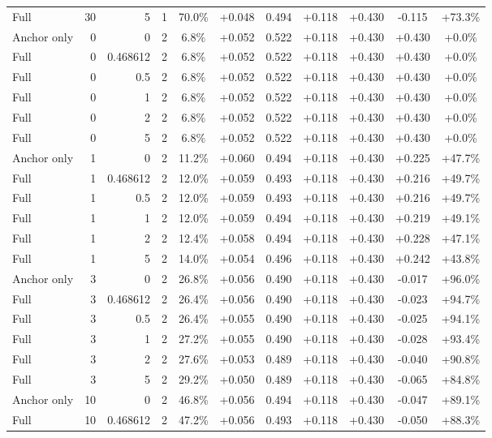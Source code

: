 \begin{table}[htbp]
\begin{tabular}{lrrrccccccc}
Full & 30 & 5 & 1 & 70.0\% & +0.048 & 0.494 & +0.118 & +0.430 & -0.115 & +73.3\% \\
Anchor only & 0 & 0 & 2 & 6.8\% & +0.052 & 0.522 & +0.118 & +0.430 & +0.430 & +0.0\% \\
Full & 0 & 0.468612 & 2 & 6.8\% & +0.052 & 0.522 & +0.118 & +0.430 & +0.430 & +0.0\% \\
Full & 0 & 0.5 & 2 & 6.8\% & +0.052 & 0.522 & +0.118 & +0.430 & +0.430 & +0.0\% \\
Full & 0 & 1 & 2 & 6.8\% & +0.052 & 0.522 & +0.118 & +0.430 & +0.430 & +0.0\% \\
Full & 0 & 2 & 2 & 6.8\% & +0.052 & 0.522 & +0.118 & +0.430 & +0.430 & +0.0\% \\
Full & 0 & 5 & 2 & 6.8\% & +0.052 & 0.522 & +0.118 & +0.430 & +0.430 & +0.0\% \\
Anchor only & 1 & 0 & 2 & 11.2\% & +0.060 & 0.494 & +0.118 & +0.430 & +0.225 & +47.7\% \\
Full & 1 & 0.468612 & 2 & 12.0\% & +0.059 & 0.493 & +0.118 & +0.430 & +0.216 & +49.7\% \\
Full & 1 & 0.5 & 2 & 12.0\% & +0.059 & 0.493 & +0.118 & +0.430 & +0.216 & +49.7\% \\
Full & 1 & 1 & 2 & 12.0\% & +0.059 & 0.494 & +0.118 & +0.430 & +0.219 & +49.1\% \\
Full & 1 & 2 & 2 & 12.4\% & +0.058 & 0.494 & +0.118 & +0.430 & +0.228 & +47.1\% \\
Full & 1 & 5 & 2 & 14.0\% & +0.054 & 0.496 & +0.118 & +0.430 & +0.242 & +43.8\% \\
Anchor only & 3 & 0 & 2 & 26.8\% & +0.056 & 0.490 & +0.118 & +0.430 & -0.017 & +96.0\% \\
Full & 3 & 0.468612 & 2 & 26.4\% & +0.056 & 0.490 & +0.118 & +0.430 & -0.023 & +94.7\% \\
Full & 3 & 0.5 & 2 & 26.4\% & +0.055 & 0.490 & +0.118 & +0.430 & -0.025 & +94.1\% \\
Full & 3 & 1 & 2 & 27.2\% & +0.055 & 0.490 & +0.118 & +0.430 & -0.028 & +93.4\% \\
Full & 3 & 2 & 2 & 27.6\% & +0.053 & 0.489 & +0.118 & +0.430 & -0.040 & +90.8\% \\
Full & 3 & 5 & 2 & 29.2\% & +0.050 & 0.489 & +0.118 & +0.430 & -0.065 & +84.8\% \\
Anchor only & 10 & 0 & 2 & 46.8\% & +0.056 & 0.494 & +0.118 & +0.430 & -0.047 & +89.1\% \\
Full & 10 & 0.468612 & 2 & 47.2\% & +0.056 & 0.493 & +0.118 & +0.430 & -0.050 & +88.3\% \\

\end{tabular}
\end{table}
